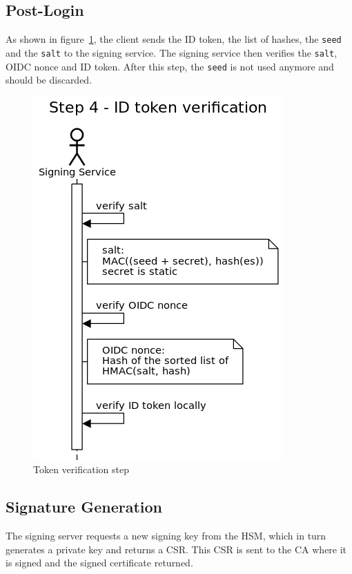 \subsection{Post-Login}\label{subsec:post-login}
As shown in figure~\ref{fig:tokenverificationstep},
the client sends the ID token, the list of hashes, the \texttt{seed} and the \texttt{salt} to the signing service.
The signing service then verifies the \texttt{salt}, OIDC nonce and ID token.
After this step, the \texttt{seed} is not used anymore and should be discarded.


\begin{figure}
	\begin{center}
		\includegraphics[scale=0.5]{images/protocol_step4_id_token_verification.png}
		\caption{Token verification step}
		\label{fig:tokenverificationstep}
	\end{center}
\end{figure}

\subsection{Signature Generation}\label{subsec:signature-generation}
The signing server requests a new signing key from the \gls{HSM}, which in turn generates a private key and returns a \gls{CSR}.
This \gls{CSR} is sent to the \gls{CA} where it is signed and the signed certificate returned.

